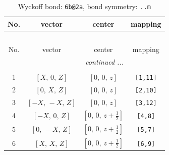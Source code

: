 \documentclass[fleqn,8pt]{jsarticle}
\begin{document}
\begin{longtable}{cccc}
\caption{Wyckoff bond: {\tt 6b@2a}, bond symmetry: {\tt ..m}}
 \\
 \hline \hline
No. & vector & center & mapping \\ \hline \endfirsthead

\multicolumn{3}{l}{\tablename\ \thetable{}} \\
 \hline \hline
No. & vector & center & mapping \\ \hline \endhead

 \hline \hline
\multicolumn{3}{r}{\footnotesize\it continued ...} \\ \endfoot

 \hline \hline
\multicolumn{3}{r}{} \\ \endlastfoot

1 & $\left[ X,\, 0,\, Z \right]$ & $\left[ 0,\, 0,\, z \right]$ & {\tt [1,11]} \\ \hline
2 & $\left[ 0,\, X,\, Z \right]$ & $\left[ 0,\, 0,\, z \right]$ & {\tt [2,10]} \\ \hline
3 & $\left[ - X,\, - X,\, Z \right]$ & $\left[ 0,\, 0,\, z \right]$ & {\tt [3,12]} \\ \hline
4 & $\left[ - X,\, 0,\, Z \right]$ & $\left[ 0,\, 0,\, z + \frac{1}{2} \right]$ & {\tt [4,8]} \\ \hline
5 & $\left[ 0,\, - X,\, Z \right]$ & $\left[ 0,\, 0,\, z + \frac{1}{2} \right]$ & {\tt [5,7]} \\ \hline
6 & $\left[ X,\, X,\, Z \right]$ & $\left[ 0,\, 0,\, z + \frac{1}{2} \right]$ & {\tt [6,9]} \\
\end{longtable}
\renewcommand{\arraystretch}{1.2}
\end{document}
